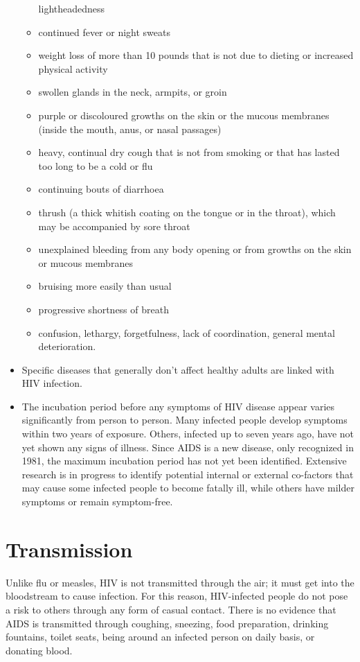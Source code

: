 \begin{itemize}
\begin{itemize}
lightheadedness
	\item continued fever or night sweats
	\item weight loss of more than 10 pounds that is not due to dieting or increased physical
activity
	\item swollen glands in the neck, armpits, or groin
	\item purple or discoloured growths on the skin or the mucous membranes (inside the
mouth, anus, or nasal passages)
	\item heavy, continual dry cough that is not from smoking or that has lasted too long to be a
cold or flu
	\item continuing bouts of diarrhoea
	\item thrush (a thick whitish coating on the tongue or in the throat), which may be
accompanied by sore throat
	\item unexplained bleeding from any body opening or from growths on the skin or mucous
membranes
	\item bruising more easily than usual
	\item progressive shortness of breath
	\item confusion, lethargy, forgetfulness, lack of coordination, general mental deterioration.
	\end{itemize}
\item Specific diseases that generally don't affect healthy adults are linked with HIV infection.
\item The incubation period before any symptoms of HIV disease appear varies significantly
from person to person. Many infected people develop symptoms within two years of
exposure. Others, infected up to seven years ago, have not yet shown any signs of illness.
Since AIDS is a new disease, only recognized in 1981, the maximum incubation period
has not yet been identified. Extensive research is in progress to identify potential internal
or external co-factors that may cause some infected people to become fatally ill, while
others have milder symptoms or remain symptom-free.
\end{itemize}

\section{Transmission}

Unlike flu or measles, HIV is not transmitted through the air; it must get into the bloodstream
to cause infection. For this reason, HIV-infected people do not pose a risk to others through
any form of casual contact. There is no evidence that AIDS is transmitted through coughing,
sneezing, food preparation, drinking fountains, toilet seats, being around an infected person
on daily basis, or donating blood.

